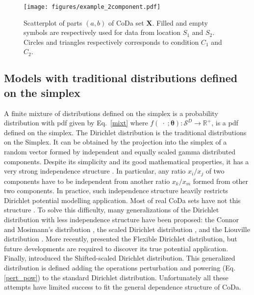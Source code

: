 \documentclass[12pt, a4paper]{article}
\newcommand{\m}[1]{\boldsymbol{#1}}
\begin{document}
\begin{figure}[thbp]
\centering
\texttt{[image: figures/example\_2component.pdf]}
\caption{Scatterplot of parts $(a,b)$ of CoDa set $\mathbf{X}$. Filled and empty symbols are respectively used for
data from location $S_1$ and $S_2$. Circles and triangles respectively corresponds to condition
$C_1$ and $C_2$.}\label{example_elim_2_components}
\end{figure}

\subsection{Models with traditional distributions defined on the simplex}
\label{simplex_section}

\noindent A finite mixture of distributions defined on the simplex is a probability distribution with pdf given by Eq.~\ref{mixt} where $f(\;\cdot\;;\m\theta): \mathcal{S}^D \rightarrow \mathbb{R}^+$, is a pdf defined on the simplex. The Dirichlet distribution is the traditional distributions on the Simplex. It can be obtained by the projection into the simplex of a random vector formed by independent and equally scaled gamma distributed components. 
Despite its simplicity and its good mathematical properties, it has a very strong independence structure \citep{aitchison1986statistical}. In particular, any ratio $x_i/x_j$ of two components have to be independent from another
ratio $x_k/x_m$ formed from other two components. In practice, such independence structure heavily restricts Dirichlet potential modelling application. Most of real CoDa sets have not this structure \citep{aitchison1986statistical}. To solve this difficulty, many generalizations of the Dirichlet distribution with less independence structure have been proposed: the Connor and Mosimann's distribution
\citep{connor1969concepts}, the scaled Dirichlet distribution \citep{aitchison1986statistical},  and the Liouville distribution \citep{rayens1994dependence}.  More recently, \cite{ongaro2008new} presented the Flexible Dirichlet distribution, but future
developments are required to discover its true potential application. Finally, \cite{monti2011shifted} introduced the Shifted-scaled Dirichlet distribution. This generalized distribution is defined adding the operations
perturbation and powering (Eq. \ref{pert_pow}) to the standard Dirichlet distribution. Unfortunately all these attempts
have limited success to fit the general dependence structure of CoDa.
\end{document}
